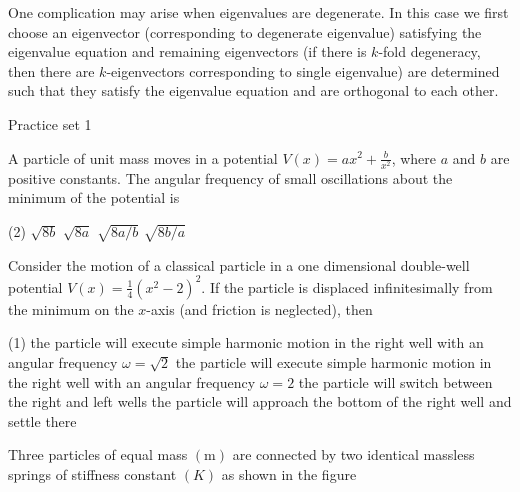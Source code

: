  One complication may arise when eigenvalues are degenerate. In this case we first choose an eigenvector (corresponding to degenerate eigenvalue) satisfying the eigenvalue equation and remaining eigenvectors (if there is $k$-fold degeneracy, then there are $k$-eigenvectors corresponding to single eigenvalue) are determined such that they satisfy the eigenvalue equation and are orthogonal to each other.
 \newpage
 \begin{abox}
 	Practice set 1
 	\end{abox}
 \begin{enumerate}
 	\begin{minipage}{\textwidth}
 		\item  A particle of unit mass moves in a potential $V(x)=a x^{2}+\frac{b}{x^{2}}$, where $a$ and $b$ are positive constants. The angular frequency of small oscillations about the minimum of the potential is
 	\end{minipage}
 	\begin{tasks}(2)
 		\task[\textbf{A.}] $\sqrt{8 b}$
 		\task[\textbf{B.}]$\sqrt{8 a}$
 		\task[\textbf{C.}] $\sqrt{8 a / b}$
 		\task[\textbf{D.}]$\sqrt{8 b / a}$
 	\end{tasks}
 	\begin{minipage}{\textwidth}
 	\item Consider the motion of a classical particle in a one dimensional double-well potential $V(x)=\frac{1}{4}\left(x^{2}-2\right)^{2} .$ If the particle is displaced infinitesimally from the minimum on the $x$-axis (and friction is neglected), then
 \end{minipage}
 \begin{tasks}(1)
 	\task[\textbf{A.}] the particle will execute simple harmonic motion in the right well with an angular frequency $\omega=\sqrt{2}$
 	\task[\textbf{B.}]the particle will execute simple harmonic motion in the right well with an angular frequency $\omega=2$
 	\task[\textbf{C.}]the particle will switch between the right and left wells
 	\task[\textbf{D.}]the particle will approach the bottom of the right well and settle there
 \end{tasks}
\begin{minipage}{\textwidth}
	\item Three particles of equal mass $(\mathrm{m})$ are connected by two identical massless springs of stiffness constant $(K)$ as shown in the figure\\
	\begin{figure}[H]

\end{figure}
\end{minipage}
\end{enumerate}

